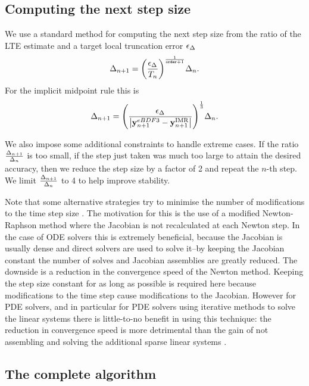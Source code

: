 \subsection{Computing the next step size}

We use a standard method \cite[268]{GreshoSani} for computing the next step size from the ratio of the LTE estimate and a target local truncation error $\epsilon_{\Delta_{}}$
\begin{equation}
  \Delta_{n+1} = {\left(  \frac{\epsilon_{\Delta_{}}}{T_n}  \right)}^{\frac{1}{\texttt{order}+1}} \Delta_{n} .
\end{equation}
For the implicit midpoint rule this is
\begin{equation}
  \Delta_{n+1} = {\left(  \frac{\epsilon_{\Delta_{}}}{\left|{\boldsymbol{\mathrm{y}}_{n+1}^{eBDF3} - \boldsymbol{\mathrm{y}}_{n+1}^{\mathrm{IMR}}} \right|}  \right)}^{\frac{1}{3}}  \Delta_{n}.
  \label{eq:next-step-dt}
\end{equation}

We also impose some additional constraints to handle extreme cases.
If the ratio $\frac{\Delta_{n+1}}{\Delta_{n}}$ is too small, \ie if the step just taken was much too large to attain the desired accuracy, then we reduce the step size by a factor of 2 and repeat the $n$-th step.
We limit $\frac{\Delta_{n+1}}{\Delta_{n}}$ to 4 to help improve stability.

Note that some alternative strategies try to minimise the number of modifications to the time step size \cite[Chap. 6]{Iserles2009} \cite[Sec. 2.1]{cvode-manual}.
The motivation for this is the use of a modified Newton-Raphson method where the Jacobian is not recalculated at each Newton step.
In the case of ODE solvers this is extremely beneficial, because the Jacobian is usually dense and direct solvers are used to solve it--by keeping the Jacobian constant the number of solves and Jacobian assemblies are greatly reduced.
The downside is a reduction in the convergence speed of the Newton method.
Keeping the step size constant for as long as possible is required here because modifications to the time step cause modifications to the Jacobian.
However for PDE solvers, and in particular for PDE solvers using iterative methods to solve the linear systems there is little-to-no benefit in using this technique: the reduction in convergence speed is more detrimental than the gain of not assembling and solving the additional sparse linear systems \cite[128]{Iserles2009}.


\subsection{The complete algorithm}

